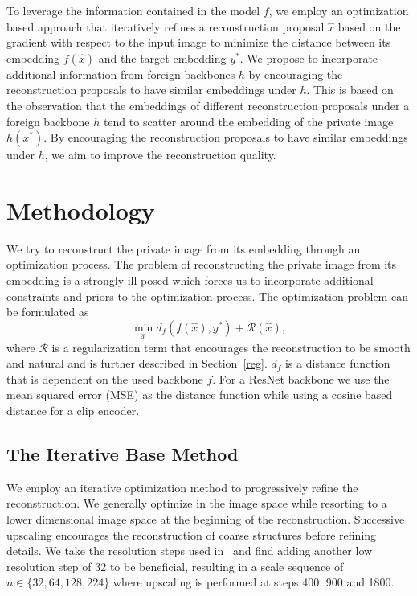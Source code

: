 \documentclass[10pt,twocolumn]{article}
\begin{document}
To leverage the information contained in the model $f$, we employ an optimization based approach that iteratively refines a reconstruction proposal $\hat{x}$ based on the gradient with respect to the input image to minimize the distance between its embedding $f(\hat{x})$ and the target embedding $y^*$.
We propose to incorporate additional information from foreign backbones $h$ by encouraging the reconstruction proposals to have similar embeddings under $h$.
This is based on the observation that the embeddings of different reconstruction proposals under a foreign backbone $h$ tend to scatter around the embedding of the private image $h(x^*)$.
By encouraging the reconstruction proposals to have similar embeddings under $h$, we aim to improve the reconstruction quality.

\section{Methodology}
We try to reconstruct the private image from its embedding through an optimization process.
The problem of reconstructing the private image from its embedding is a strongly ill posed which forces us to incorporate additional constraints and priors to the optimization process.
The optimization problem can be formulated as
$$
\min_{\hat{x}} d_f(f(\hat{x}), y^*) + \mathcal{R}(\hat{x}),
$$
where $\mathcal{R}$ is a regularization term that encourages the reconstruction to be smooth and natural and is further described in Section~\ref{reg}.
$d_f$ is a distance function that is dependent on the used backbone $f$.
For a ResNet backbone we use the mean squared error (MSE) as the distance function while using a cosine based distance for a clip encoder.
\subsection{The Iterative Base Method}\label{base_method}
We employ an iterative optimization method to progressively refine the reconstruction.
We generally optimize in the image space while resorting to a lower dimensional image space at the beginning of the reconstruction.
Successive upscaling encourages the reconstruction of coarse structures before refining details.
We take the resolution steps used in~\cite{kazemiWhatWeLearn2024} and find adding another low resolution step of 32 to be beneficial, resulting in a scale sequence of $n\in\{32, 64, 128, 224\}$ where upscaling is performed at steps 400, 900 and 1800.
\end{document}
